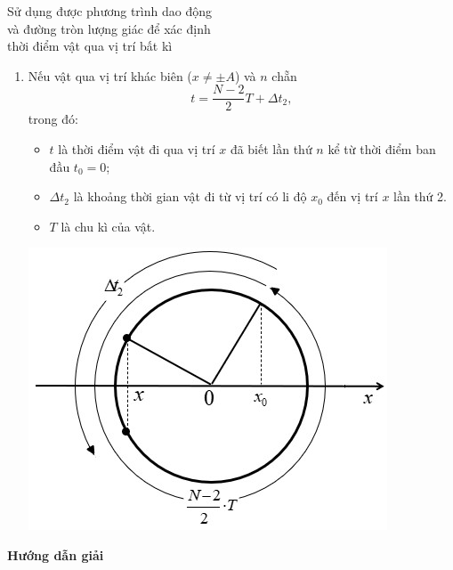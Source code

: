 \begin{dang}{Sử dụng được phương trình dao động\\ và đường tròn lượng giác để xác định\\ thời điểm vật qua vị trí bất kì}
{\begin{description}
\begin{enumerate}[label=\alph*)]
				\item Nếu vật qua vị trí khác biên ($x\neq\pm A$) và $n$ chẵn
				\begin{equation*}
					t=\dfrac{N-2}{2}T+\Delta t_2,
				\end{equation*}
				trong đó:
				\begin{itemize}
					\item $t$ là thời điểm vật đi qua vị trí $x$ đã biết lần thứ $n$ kể từ thời điểm ban đầu $t_0=0$;
					\item $\Delta t_2$ là khoảng thời gian vật đi từ vị trí có li độ $x_0$ đến vị trí $x$ lần thứ 2.
					\item $T$ là chu kì của vật.
				\end{itemize}
				\begin{center}
					\includegraphics[scale=0.8]{../figs/VN12-PH-02-A-001-4-V2-5.jpg}
				\end{center}
				
			\end{enumerate}
	\end{description}}
	{\begin{center}
			\textbf{Hướng dẫn giải}
		\end{center}
		
}
\end{dang}
